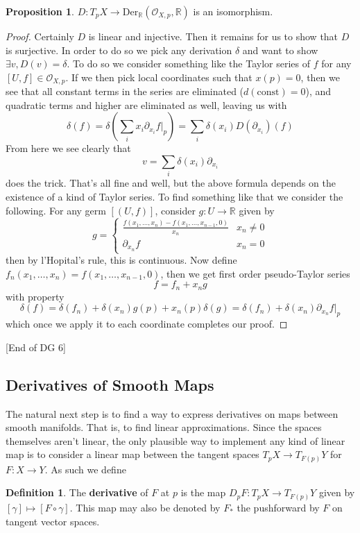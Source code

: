 \documentclass{article}
\theoremstyle{definition}
\newtheorem{definition}{Definition}
\newtheorem{proposition}{Proposition}
\begin{document}
\begin{proposition}
$D : T_pX \to \text{Der}_\mathbb{R}(\mathcal{O}_{X, p}, \mathbb{R})$ is an isomorphism.
\end{proposition}
\begin{proof}
Certainly $D$ is linear and injective. Then it remains for us to show that $D$
is surjective. In order to do so we pick any derivation $\delta$ and want to
show $\exists v, D(v) = \delta$. To do so we consider something like the Taylor
series of $f$ for any $[U, f] \in \mathcal{O}_{X, p}$. If we then pick local
coordinates such that $x(p) = 0$, then we see that all constant terms in the
series are eliminated ($d(\text{const}) = 0$), and quadratic terms and higher
are eliminated as well, leaving us with
$$ \delta(f) = \delta(\sum_i x_i \partial_{x_i}f|_p) = \sum_i \delta(x_i)
D(\partial_{x_i})(f)$$
From here we see clearly that 
$$ v = \sum_i \delta(x_i) \partial_{x_i} $$
does the trick. That's all fine and well, but the above formula depends on the
existence of a kind of Taylor series. To find something like that we consider
the following. For any germ $[(U, f)]$, consider $g: U \to \mathbb{R}$ given by
$$ g =
\begin{cases}
\frac{f(x_1, \dots, x_n) - f(x_1, \dots, x_{n-1}, 0)}{x_n} & x_n \neq 0 \\
\partial_{x_n} f & x_n = 0
\end{cases}
$$
then by l'Hopital's rule, this is continuous. Now define
$f_n(x_1, \dots, x_n) = f(x_1, \dots, x_{n - 1}, 0)$, then we get first order
pseudo-Taylor series
$$ f = f_n + x_n g $$
with property
$$ \delta(f) = \delta(f_n) + \delta(x_n) g(p) + x_n(p) \delta(g) = \delta(f_n)
+ \delta(x_n) \partial_{x_n} f|_p$$
which once we apply it to each coordinate completes our proof.
\end{proof}

[End of DG 6]

\subsection{Derivatives of Smooth Maps}

The natural next step is to find a way to express derivatives on maps between
smooth manifolds. That is, to find linear approximations. Since the spaces
themselves aren't linear, the only plausible way to implement any kind of linear
map is to consider a linear map between the tangent spaces $T_pX \to T_{F(p)}Y$
for $F: X \to Y$. As such we define

\begin{definition}
The \textbf{derivative} of $F$ at $p$ is the map $D_pF : T_pX \to T_{F(p)}Y$
given by $[\gamma] \mapsto [F \circ \gamma]$. This map may also be denoted by
$F_*$ the pushforward by $F$ on tangent vector spaces.
\end{definition}
\end{document}
